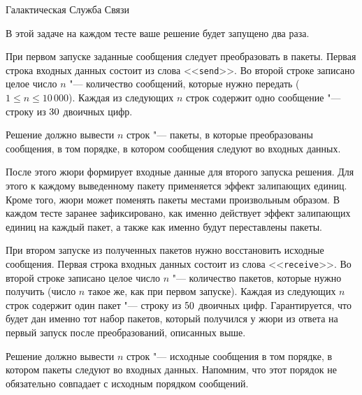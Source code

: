 \begin{problem}{Галактическая Служба Связи}
\Interaction

В этой задаче на каждом тесте ваше решение будет запущено два раза.

При первом запуске заданные сообщения следует преобразовать в пакеты.
Первая строка входных данных состоит из слова <<\texttt{send}>>.
Во второй строке записано целое число $n$ "--- количество сообщений,
которые нужно передать ($1 \le n \le 10\,000$).
Каждая из следующих $n$ строк содержит одно сообщение "--- строку
из $30$ двоичных цифр.

Решение должно вывести $n$ строк "--- пакеты,
в которые преобразованы сообщения, в том порядке,
в котором сообщения следуют во входных данных.

После этого жюри формирует входные данные для второго запуска решения.
Для этого к каждому выведенному пакету применяется эффект залипающих единиц.
Кроме того, жюри может поменять пакеты местами произвольным образом.
В каждом тесте заранее зафиксировано,
как именно действует эффект залипающих единиц на каждый пакет,
а также как именно будут переставлены пакеты.

При втором запуске из полученных пакетов нужно восстановить исходные сообщения.
Первая строка входных данных состоит из слова <<\texttt{receive}>>.
Во второй строке записано целое число $n$ "--- количество пакетов,
которые нужно получить (число $n$ такое же, как при первом запуске).
Каждая из следующих $n$ строк содержит один пакет "--- строку
из $50$ двоичных цифр.
Гарантируется, что будет дан именно тот набор пакетов,
который получился у жюри из ответа на первый запуск
после преобразований, описанных выше.

Решение должно вывести $n$ строк "--- исходные сообщения
в том порядке, в котором пакеты следуют во входных данных.
Напомним, что этот порядок не обязательно совпадает с исходным
порядком сообщений.

\Examples

\begin{examplewide}
%
\end{examplewide}

\begin{examplewide}
%
\end{examplewide}


\end{problem}

